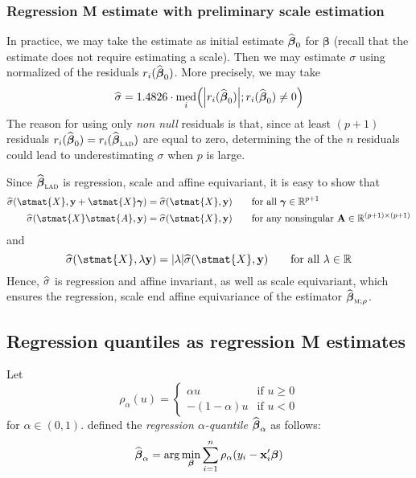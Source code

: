 \subsubsection{Regression M estimate with preliminary scale estimation}

In practice, we may take the  estimate as initial estimate
$\widehat{\boldsymbol\beta}_0$ for $\boldsymbol\beta$ (recall that the 
estimate does not require estimating a scale). Then we may estimate $\sigma$
using normalized  of the residuals
$r_{i}(\widehat{\boldsymbol\beta}_0)$. More precisely, we may take
\[
    \sthat{\sigma} = 1.4826 \cdot 
    \med_{i}\left(\left|r_{i}(\sthat{\boldsymbol\beta}_0)\right|; r_{i}(\sthat{\boldsymbol\beta}_0) \neq 0\right)
\]
The reason for using only \emph{non null} residuals is that, since at least
$(p+1)$ residuals $r_{i}(\sthat{\boldsymbol\beta}_0) =
r_{i}(\sthat{\boldsymbol\beta}_{\stsc{LAD}})$ are equal to zero, determining
the  of the $n$ residuals could lead to underestimating $\sigma$ when
$p$ is large.

Since $\sthat{\boldsymbol\beta}_{\stsc{LAD}}$ is regression, scale and
affine equivariant, it is easy to show that
%
\begin{align*}
    \sthat{\sigma}(\stmat{X}, \stvec{y} + \stmat{X}\boldsymbol\gamma)
        &= \sthat{\sigma}(\stmat{X}, \stvec{y})
        \qquad\text{for all $\boldsymbol\gamma \in \mathbb{R}^{p+1}$}\\
    \sthat{\sigma}(\stmat{X}\stmat{A}, \stvec{y})
        &= \sthat{\sigma}(\stmat{X}, \stvec{y})
        \qquad\text{for any nonsingular $\mathbf{A} \in \mathbb{R}^{(p+1)\times(p+1)}$}
\end{align*}
%
and
\[
    \sthat{\sigma}(\stmat{X}, \lambda\stvec{y}) 
    = |\lambda| \sthat{\sigma} (\stmat{X}, \stvec{y})
    \qquad\text{for all $\lambda\in\mathbb{R}$}
\]
Hence, $\widehat{\sigma}$ is regression and affine invariant, as well as scale
equivariant, which ensures the regression, scale end affine equivariance of
the  estimator $\sthat{\boldsymbol\beta}_{\stsc{M};\rho}$.


\subsection{Regression quantiles as regression M estimates}

Let
\[
    \rho_{\alpha}(u)=
    \begin{cases}
        \alpha u     & \text{if $u\geq0$}\\
        -(1-\alpha)u & \text{if $u<0$}
    \end{cases}
\]
for $\alpha \in (0,1)$. \citet{Koenker:1978} defined the \emph{regression $\alpha$-quantile} 
$\widehat{\boldsymbol\beta}_{\alpha}$ as follows:
%
\begin{equation}\label{eq:quantile_regr_min}
    \widehat{\boldsymbol\beta}_{\alpha} 
    = \arg\min_{\boldsymbol\beta} \sum_{i=1}^{n} \rho_{\alpha}(y_{i}-\mathbf x_{i}'\boldsymbol\beta)
\end{equation}

